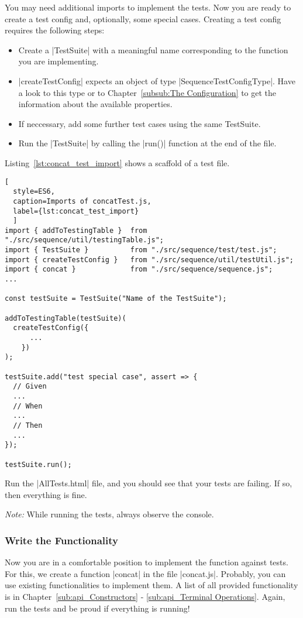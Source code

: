 You may need additional imports to implement the tests.
\newline
Now you are ready to create a test config and, optionally, some special cases.
Creating a test config requires the following steps:

\begin{itemize}
  \item{Create a |TestSuite| with a meaningful name corresponding to the function you are implementing.}
  \item{|createTestConfig| expects an object of type |SequenceTestConfigType|. Have a look
    to this type or to Chapter~\ref{subsub:The Configuration} to get the information about the available properties. }
      \item{If neccessary, add some further test cases using the same TestSuite.}
  \item{Run the |TestSuite| by calling the |run()| function at the end of the file. }
\end{itemize}

Listing~\ref{lst:concat_test_import} shows a scaffold of a test file. 

\begin{lstlisting}[
  style=ES6, 
  caption=Imports of concatTest.js,
  label={lst:concat_test_import}
  ]
import { addToTestingTable }  from "./src/sequence/util/testingTable.js";
import { TestSuite }          from "./src/sequence/test/test.js";
import { createTestConfig }   from "./src/sequence/util/testUtil.js";
import { concat }             from "./src/sequence/sequence.js";
...

const testSuite = TestSuite("Name of the TestSuite");

addToTestingTable(testSuite)(
  createTestConfig({
      ...
    })
);

testSuite.add("test special case", assert => {
  // Given
  ...
  // When
  ...
  // Then
  ...
});

testSuite.run();
\end{lstlisting}

Run the |AllTests.html| file, and you should see that your tests are failing.
If so, then everything is fine.

\textit{Note:} While running the tests, always observe the console.

\subsubsection{Write the Functionality}
Now you are in a comfortable position to implement the function against tests.
For this, we create a function |concat| in the file |concat.js|.
Probably, you can use existing functionalities to implement them. A list of all
provided functionality is in Chapter~\ref{sub:api_Constructors} - \ref{sub:api_Terminal Operations}.
\newline
Again, run the tests and be proud if everything is running!

